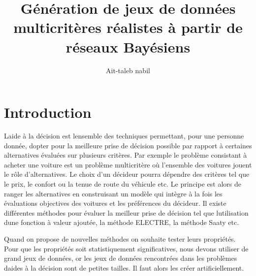 \documentclass[a4paper]{article}
\begin{document}
\def\ci{\perp\!\!\!\perp}
\newcommand\independent{\protect\mathpalette{\protect\independenT}{\perp}} 
\def\independenT#1#2{\mathrel{\rlap{$#1#2$}\mkern2mu{#1#2}}} 

\setlength{\parskip}{1.5ex} %
\setlength{\parindent}{0pt}
\newcommand{\definition}[1]{\textit{\textbf{#1}}}
\newenvironment{theorem}[1]{\textbf{#1}$\quad$\begin{itshape}}{\end{itshape}}

\author{Ait-taleb nabil}
\title{Génération de jeux de données multicritères réalistes à partir de réseaux Bayésiens}

\maketitle

\tableofcontents

\newpage

\section{Introduction}



L\textquotesingle aide à la décision est l\textquotesingle ensemble des techniques permettant, pour une personne donnée, d\textquotesingle opter pour la meilleure prise de décision possible par rapport à certaines alternatives évaluées sur plusieurs critères.
Par exemple le problème consistant à acheter une voiture est un problème multicritère où l'ensemble des voitures jouent le rôle d'alternatives.
 Le choix d'un décideur pourra dépendre des critères tel que le prix, le confort ou  la tenue de route du véhicule etc.
Le principe est alors de ranger les alternatives en construisant un modèle qui intègre à la fois les évaluations objectives des voitures  et les préférences du décideur.
Il existe différentes méthodes pour évaluer la meilleur prise de décision tel que l\textquotesingle utilisation d\textquotesingle une fonction à valeur ajoutée, la méthode ELECTRE, la méthode Saaty  etc.

Quand on propose de nouvelles méthodes on souhaite tester leurs  propriétés. Pour que les propriétés soit statistiquement significatives, nous devons utiliser de grand jeux de données, or les jeux de données rencontrées dans les problèmes d\textquotesingle aides à la décision sont de petites tailles. Il faut alors les créer artificiellement. 
\end{document}
